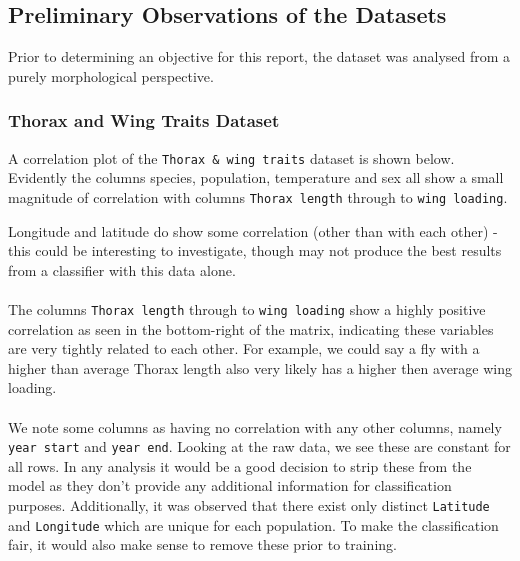 \documentclass{article}
\begin{document}
\newpage
\subsection{Preliminary Observations of the Datasets}

Prior to determining an objective for this report, the dataset was analysed from a purely morphological perspective.

\subsubsection{Thorax and Wing Traits Dataset}

A correlation plot of the \texttt{Thorax \& wing traits} dataset is shown below. Evidently the columns species, population, temperature and sex all show a small magnitude of correlation with columns \texttt{Thorax length} through to \texttt{wing loading}. 

Longitude and latitude do show some correlation (other than with each other) - this could be interesting to investigate, though may not produce the best results from a classifier with this data alone. \\
\\
The columns \texttt{Thorax length} through to \texttt{wing loading} show a highly positive correlation as seen in the bottom-right of the matrix, indicating these variables are very tightly related to each other. For example, we could say a fly with a higher than average Thorax length also very likely has a higher then average wing loading. \\
\\
We note some columns as having no correlation with any other columns, namely \texttt{year start} and \texttt{year end}. Looking at the raw data, we see these are constant for all rows. In any analysis it would be a good decision to strip these from the model as they don't provide any additional information for classification purposes. Additionally, it was observed that there exist only distinct \texttt{Latitude} and \texttt{Longitude} which are unique for each population. To make the classification fair, it would also make sense to remove these prior to training.
\end{document}
